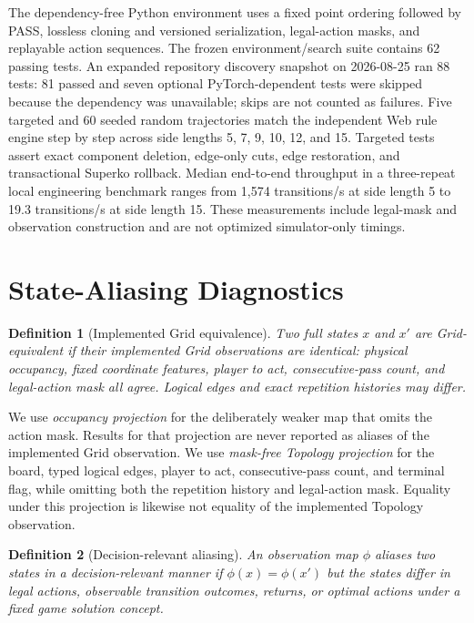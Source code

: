 \documentclass{article}
\newtheorem{definition}{Definition}
\begin{document}
The dependency-free Python environment uses a fixed point ordering followed by
PASS, lossless cloning and versioned serialization, legal-action masks, and
replayable action sequences. The frozen environment/search suite contains 62
passing tests. An expanded repository discovery snapshot on 2026-08-25 ran 88
tests: 81 passed and seven optional PyTorch-dependent tests were skipped because
the dependency was unavailable; skips are not counted as failures.
Five targeted and 60 seeded random trajectories match the independent Web rule
engine step by step across side lengths 5, 7, 9, 10, 12, and 15. Targeted tests
assert exact component deletion, edge-only cuts, edge restoration, and
transactional Superko rollback. Median end-to-end throughput in a three-repeat
local engineering benchmark ranges from 1,574 transitions/s at side length 5
to 19.3 transitions/s at side length 15. These measurements include legal-mask
and observation construction and are not optimized simulator-only timings.

\section{State-Aliasing Diagnostics}
\label{sec:aliasing}

\begin{definition}[Implemented Grid equivalence]
Two full states $x$ and $x'$ are Grid-equivalent if their implemented Grid
observations are identical: physical occupancy, fixed coordinate features,
player to act, consecutive-pass count, and legal-action mask all agree.
Logical edges and exact repetition histories may differ.
\end{definition}

We use \emph{occupancy projection} for the deliberately weaker map that omits
the action mask. Results for that projection are never reported as aliases of
the implemented Grid observation.
We use \emph{mask-free Topology projection} for the board, typed logical edges,
player to act, consecutive-pass count, and terminal flag, while omitting both
the repetition history and legal-action mask. Equality under this projection
is likewise not equality of the implemented Topology observation.

\begin{definition}[Decision-relevant aliasing]
An observation map $\phi$ aliases two states in a decision-relevant manner if
$\phi(x)=\phi(x')$ but the states differ in legal actions, observable transition
outcomes, returns, or optimal actions under a fixed game solution concept.
\end{definition}
\end{document}
